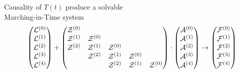 \documentclass[12pt,usenames,dvipsnames]{beamer}
\begin{document}
\begin{frame}{Causality of $T(t)$ produce a solvable \\ Marching-in-Time system}
  \begin{equation*}
  	\mqty(\mathcal{L}^{(0)} \\ \mathcal{L}^{(1)} \\ \mathcal{L}^{(2)} \\ \mathcal{L}^{(3)} \\ \mathcal{L}^{(4)}) + 
    \mqty(
      \mathcal{Z}^{(0)} \\
      \mathcal{Z}^{(1)} & \mathcal{Z}^{(0)} \\
      \mathcal{Z}^{(2)} & \mathcal{Z}^{(1)} & \mathcal{Z}^{(0)} \\
      & \mathcal{Z}^{(2)} & \mathcal{Z}^{(1)} & \mathcal{Z}^{(0)} \\
      & & \mathcal{Z}^{(2)} & \mathcal{Z}^{(1)} & \mathcal{Z}^{(0)} 
    ) \cdot 
  	\mqty(\mathcal{A}^{(0)} \\ \mathcal{A}^{(1)} \\ \mathcal{A}^{(2)} \\ \mathcal{A}^{(3)} \\ \mathcal{A}^{(4)}) \rightarrow
  	\mqty(\mathcal{F}^{(0)} \\ \mathcal{F}^{(1)} \\ \mathcal{F}^{(2)} \\ \mathcal{F}^{(3)} \\ \mathcal{F}^{(4)})
  \end{equation*}

  \vspace{0.2cm}

\end{frame}
\end{document}
